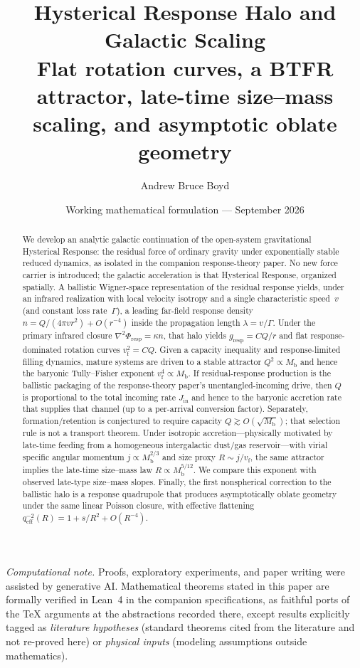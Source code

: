 \documentclass[11pt]{article}
\title{\textbf{Hysterical Response Halo and Galactic Scaling}\\[0.45em]
\large Flat rotation curves, a BTFR attractor, late-time size--mass scaling, and asymptotic oblate geometry}
\author{Andrew Bruce Boyd}
\date{Working mathematical formulation --- September 2026}
\theoremstyle{definition}
\theoremstyle{remark}
\newcommand{\Mb}{M_{\mathrm{b}}}
\newcommand{\vf}{v_{\mathrm{f}}}
\newcommand{\qeff}{q_{\mathrm{eff}}}
\begin{document}
\maketitle
\noindent\textit{Computational note.}
Proofs, exploratory experiments, and paper writing were assisted by generative AI.
Mathematical theorems stated in this paper are formally verified in Lean~4 in the
companion specifications, as faithful ports of the TeX arguments at the abstractions
recorded there, except results explicitly tagged as \emph{literature hypotheses}
(standard theorems cited from the literature and not re-proved here) or
\emph{physical inputs} (modeling assumptions outside mathematics).

\begin{abstract}
We develop an analytic galactic continuation of the open-system gravitational Hysterical Response: the residual force of ordinary gravity under exponentially stable reduced dynamics, as isolated in the companion response-theory paper.
No new force carrier is introduced; the galactic acceleration is that Hysterical Response, organized spatially.
A ballistic Wigner-space representation of the residual response yields, under an infrared realization with local velocity isotropy and a single characteristic speed~$v$ (and constant loss rate~$\Gamma$), a leading far-field response density $n=Q/(4\pi v r^{2})+O(r^{-4})$ inside the propagation length $\lambda=v/\Gamma$.
Under the primary infrared closure $\nabla^{2}\Phi_{\mathrm{resp}}=\kappa n$, that halo yields $g_{\mathrm{resp}}=CQ/r$ and flat response-dominated rotation curves $\vf^{2}=CQ$.
Given a capacity inequality and response-limited filling dynamics, mature systems are driven to a stable attractor $Q^{2}\propto\Mb$ and hence the baryonic Tully--Fisher exponent $\vf^{4}\propto\Mb$.
If residual-response production is the ballistic packaging of the response-theory paper's unentangled-incoming drive, then $Q$ is proportional to the total incoming rate $J_{\mathrm{in}}$ and hence to the baryonic accretion rate that supplies that channel (up to a per-arrival conversion factor).
Separately, formation/retention is conjectured to require capacity $\boxed{Q\gtrsim O(\sqrt{\Mb})}$; that selection rule is not a transport theorem.
Under isotropic accretion---physically motivated by late-time feeding from a homogeneous intergalactic dust/gas reservoir---with virial specific angular momentum $j\propto\Mb^{2/3}$ and size proxy $R\sim j/\vf$, the same attractor implies the late-time size--mass law $R\propto\Mb^{5/12}$.
We compare this exponent with observed late-type size--mass slopes.
Finally, the first nonspherical correction to the ballistic halo is a response quadrupole that produces asymptotically oblate geometry under the same linear Poisson closure, with effective flattening $\qeff^{-2}(R)=1+s/R^{2}+O(R^{-4})$.
\end{abstract}
\tableofcontents
\newpage
\end{document}
